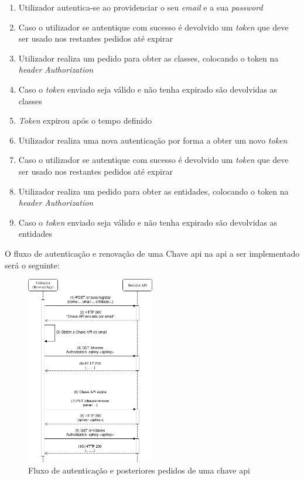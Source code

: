 \begin{enumerate}
    \item Utilizador autentica-se ao providenciar o seu \textit{email} e a sua \textit{password}
    \item Caso o utilizador se autentique com sucesso é devolvido um \textit{token} que deve ser usado nos restantes pedidos até expirar
    \item Utilizador realiza um pedido para obter as classes, colocando o token na \textit{header} \textit{Authorization}
    \item Caso o \textit{token} enviado seja válido e não tenha expirado são devolvidas as classes
    \item \textit{Token} expirou após o tempo definido
    \item Utilizador realiza uma nova autenticação por forma a obter um novo \textit{token}
    \item Caso o utilizador se autentique com sucesso é devolvido um \textit{token} que deve ser usado nos restantes pedidos até expirar
    \item Utilizador realiza um pedido para obter as entidades, colocando o token na \textit{header} \textit{Authorization}
    \item Caso o \textit{token} enviado seja válido e não tenha expirado são devolvidas as entidades
\end{enumerate}

O fluxo de autenticação e renovação de uma Chave \acrshort{api} na \acrshort{api} a ser implementado será o seguinte:
\begin{figure}[H]
    \begin{center}
        \includegraphics[width=0.5\textwidth]{img/chaveAuth.png}
    \end{center}
    \caption{Fluxo de autenticação e posteriores pedidos de uma chave \acrshort{api}}\label{fig:chaveAuth}
\end{figure}

